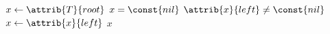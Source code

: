 \begin{codebox}
\li $x \gets \attrib{T}{root}$
\li \If $x = \const{nil}$
\li \Then
		\Return {}
\li \Else
\li 	\While $\attrib{x}{left} \neq \const{nil}$
\li 	\Do 
			$x \gets \attrib{x}{left}$
		\End
	\End
\li \Return $x$
\end{codebox}